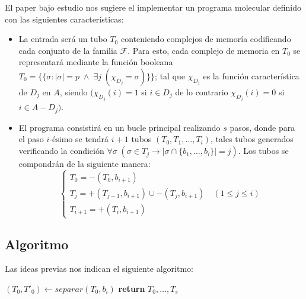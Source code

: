 \documentclass[12pt, letterpaper, twoside]{article}
\begin{document}
    El paper bajo estudio nos sugiere el implementar un programa molecular definido con las siguientes características:
    \begin{itemize}
        \item  La entrada será un tubo $T_0$ conteniendo complejos de memoría codificando cada conjunto de la familia $\mathcal{F}$. Para esto, cada complejo de memoria en $T_0$ se representará mediante la función booleana  $T_0=\{\{\sigma:|\sigma|=p\;\land\;\exists{j}\;(\chi_{D_j}=\sigma)\}\}$; tal que $\chi_{D_j}$ es la función característica de $D_j$ en $A$, siendo $(\chi_{D_j}(i) = 1$ si $i \in D_j$ de lo contrario $\chi_{D_j}(i) = 0$ si $i \in A - D_j)$.
        \item  El programa consistirá en un bucle principal realizando $s$ pasos, donde para el paso $i$-ésimo se tendrá $i+1$ tubos $(T_0, T_1,\dots,T_i)$, tales tubos generados verificando la condición $\forall\sigma\;(\sigma\in T_j \rightarrow|\sigma\cap\{b_1,\dots,b_i\}|=j)$. Los tubos se compondrán de la siguiente manera:
        \begin{equation*}
            \begin{cases}
                T_0=-(T_0,b_{i+1}) \\
                T_j=+(T_{j-1}, b_{i+1}) \cup -(T_j, b_{i+1}) \quad (1\leq{j}\leq{i}) \\
                T_{i+1} = +(T_i,b_{i+1})
            \end{cases}
        \end{equation*}
    \end{itemize}

    \subsection{Algoritmo}
    Las ideas previas nos indican el siguiente algoritmo: 
    \begin{algorithm}
        \begin{algorithmic}[1]
                    \State $(T_0, T'_0) \leftarrow separar(T_0, b_i)$
                    \EndFor
                \EndFor
                \State \textbf{return} $T_0,\dots,T_s$
            \EndProcedure
        \end{algorithmic}
    \end{algorithm}
\end{document}
